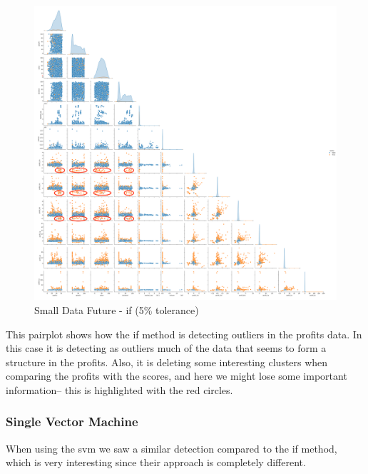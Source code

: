 \documentclass[11pt,english,a4paper,hidelinks]{book}
\begin{document}
\begin{figure}[H]
    \centering
    \includegraphics[width=1\textwidth]{images/code/outliers/Small Data future - IF.png}
    \caption{Small Data Future - \acrshort{if} (5\% tolerance)}
    \label{fig:small_data_future_if}
\end{figure}

\noindent This pairplot shows how the \acrshort{if} method is detecting outliers in the profits data. In this case it is detecting as outliers much of the data that seems to form a structure in the profits. Also, it is deleting some interesting clusters when comparing the profits with the scores, and here we might lose some important information-- this is highlighted with the red circles.

\newpage

\subsubsection{Single Vector Machine}

When using the \acrshort{svm} we saw a similar detection compared to the \acrshort{if} method, which is very interesting since their approach is completely different.
\end{document}
